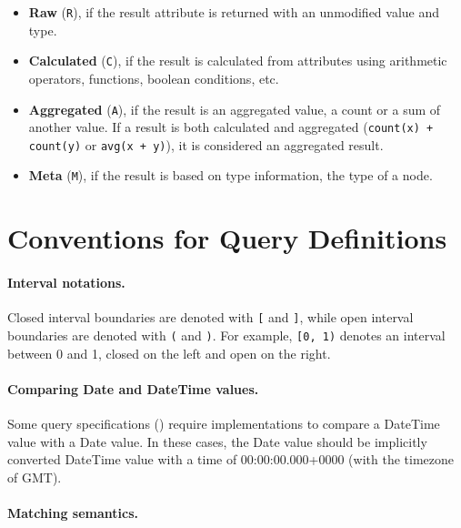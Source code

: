 \begin{itemize}
	\item \textbf{Raw} (\texttt{R}), if the result attribute is returned with an unmodified value and type.
	\item \textbf{Calculated} (\texttt{C}), if the result is calculated from attributes using arithmetic operators, functions, boolean conditions, etc.
	\item \textbf{Aggregated} (\texttt{A}), if the result is an aggregated value, \eg a count or a sum of another value. If a result is both calculated and aggregated (\eg \lstinline{count(x) + count(y)} or \lstinline{avg(x + y)}), it is considered an aggregated result.
	\item \textbf{Meta} (\texttt{M}), if the result is based on type information, \eg the type of a node.
\end{itemize}



\section{Conventions for Query Definitions}

\paragraph{Interval notations.} Closed interval boundaries are denoted with 
\texttt{[} 
and \texttt{]}, while open interval boundaries are denoted with \texttt{(} and 
\texttt{)}. For example, \texttt{[0, 1)} denotes an interval between 0 and 1, 
closed on the left and open on the right.

\paragraph{Comparing Date and DateTime values.}

Some query specifications (\eg {}) require implementations to compare a
\textsf{DateTime} value with a \textsf{Date} value. In these cases, the 
\textsf{Date} value should be implicitly converted \textsf{DateTime} value 
with a time of 00:00:00.000+0000 (\ie with the timezone of GMT).

\paragraph{Matching semantics.}

